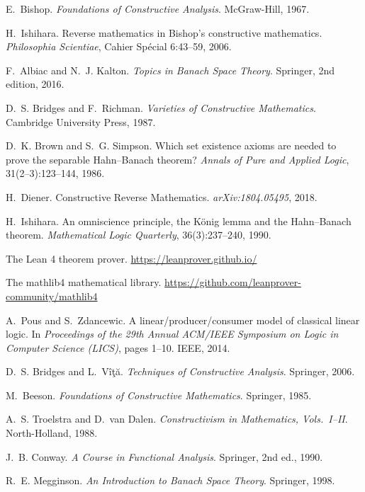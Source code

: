 \documentclass[11pt]{article}
\begin{document}

\begin{thebibliography}{10}

E.~Bishop.
\newblock \emph{Foundations of Constructive Analysis}.
\newblock McGraw-Hill, 1967.

H.~Ishihara.
\newblock Reverse mathematics in Bishop's constructive mathematics.
\newblock \emph{Philosophia Scientiae}, Cahier Sp\'ecial 6:43--59, 2006.

F.~Albiac and N.~J. Kalton.
\newblock \emph{Topics in Banach Space Theory}.
\newblock Springer, 2nd edition, 2016.

D.~S. Bridges and F.~Richman.
\newblock \emph{Varieties of Constructive Mathematics}.
\newblock Cambridge University Press, 1987.

D.~K. Brown and S.~G. Simpson.
\newblock Which set existence axioms are needed to prove the separable Hahn--Banach theorem?
\newblock \emph{Annals of Pure and Applied Logic}, 31(2--3):123--144, 1986.

H.~Diener.
\newblock Constructive Reverse Mathematics.
\newblock \emph{arXiv:1804.05495}, 2018.

H.~Ishihara.
\newblock An omniscience principle, the K\"onig lemma and the Hahn--Banach theorem.
\newblock \emph{Mathematical Logic Quarterly}, 36(3):237--240, 1990.

The Lean 4 theorem prover.
\newblock \url{https://leanprover.github.io/}

The mathlib4 mathematical library.
\newblock \url{https://github.com/leanprover-community/mathlib4}

A.~Pous and S.~Zdancewic.
\newblock A linear/producer/consumer model of classical linear logic.
\newblock In \emph{Proceedings of the 29th Annual ACM/IEEE Symposium on Logic in Computer Science (LICS)}, pages 1--10. IEEE, 2014.

D.~S. Bridges and L.~Vîţă.
\newblock \emph{Techniques of Constructive Analysis}.
\newblock Springer, 2006.

M.~Beeson.
\newblock \emph{Foundations of Constructive Mathematics}.
\newblock Springer, 1985.

A.~S. Troelstra and D.~van Dalen.
\newblock \emph{Constructivism in Mathematics, Vols.~I--II}.
\newblock North-Holland, 1988.

J.~B. Conway.
\newblock \emph{A Course in Functional Analysis}.
\newblock Springer, 2nd ed., 1990.

R.~E. Megginson.
\newblock \emph{An Introduction to Banach Space Theory}.
\newblock Springer, 1998.

\end{thebibliography}
\end{document}
